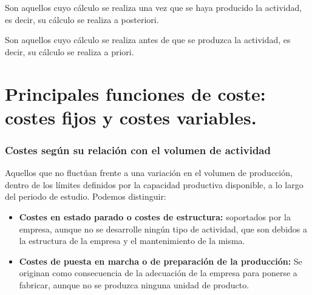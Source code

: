 \documentclass[12pt]{report} %
\begin{document}
\begin{definicion}
Son aquellos cuyo cálculo se realiza una vez que se haya producido la actividad, es decir, su cálculo se realiza a posteriori.
\end{definicion}

\begin{definicion}
Son aquellos cuyo cálculo se realiza antes de que se produzca la actividad, es decir, su cálculo se realiza a priori.
\end{definicion}

\hypertarget{principales-funciones-de-coste-costes-fijos-y-costes-variables.}{%
\section{Principales funciones de coste: costes fijos y costes
variables.}\label{principales-funciones-de-coste-costes-fijos-y-costes-variables.}}

\hypertarget{costes-seguxfan-su-relaciuxf3n-con-el-volumen-de-actividad}{%
\subsubsection{Costes según su relación con el volumen de
actividad}\label{costes-seguxfan-su-relaciuxf3n-con-el-volumen-de-actividad}}

\begin{definicion}
Aquellos que no fluctúan frente a una variación en el volumen de producción, dentro de los límites definidos por la capacidad productiva disponible, a lo largo del periodo de estudio. Podemos distinguir:
\begin{itemize}
\item \textbf{Costes en estado parado o costes de estructura:} soportados por la empresa, aunque no se desarrolle ningún tipo de actividad, que son debidos a la estructura de la empresa y el mantenimiento de la misma.
\item \textbf{Costes de puesta en marcha o de preparación de la producción:} Se originan como consecuencia de la adecuación de la empresa para ponerse a fabricar, aunque no se produzca ninguna unidad de producto. 
\end{itemize} 
\end{definicion}
\end{document}
